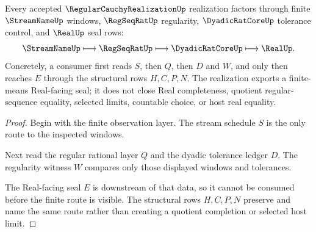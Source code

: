 \begin{theorem}
\label{thm:regular-cauchy-realization-factorization}
Every accepted $\RegularCauchyRealizationUp$ realization factors through finite $\StreamNameUp$ windows, $\RegSeqRatUp$ regularity, $\DyadicRatCoreUp$ tolerance control, and $\RealUp$ seal rows:
$$
\StreamNameUp \longmapsto \RegSeqRatUp \longmapsto \DyadicRatCoreUp \longmapsto \RealUp .
$$
Concretely, a consumer first reads $S$, then $Q$, then $D$ and $W$, and only then reaches $E$ through the structural rows $H,C,P,N$. The realization exports a finite-means Real-facing seal; it does not close Real completeness, quotient regular-sequence equality, selected limits, countable choice, or host real equality.
\end{theorem}
\begin{proof}
Begin with the finite observation layer. The stream schedule $S$ is the only route to the inspected windows.

Next read the regular rational layer $Q$ and the dyadic tolerance ledger $D$. The regularity witness $W$ compares only those displayed windows and tolerances.

The Real-facing seal $E$ is downstream of that data, so it cannot be consumed before the finite route is visible. The structural rows $H,C,P,N$ preserve and name the same route rather than creating a quotient completion or selected host limit.
\end{proof}




